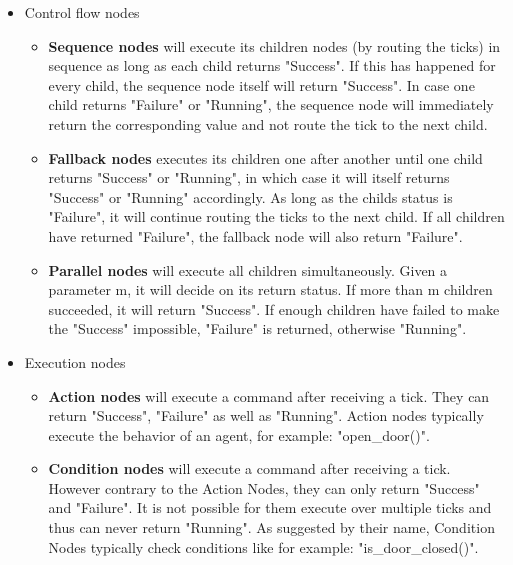 \begin{itemize}
	\item Control flow nodes
	\begin{itemize}
		\item \textbf{Sequence nodes} will execute its children nodes (by routing the ticks) in sequence as long as each child returns "Success". If this has happened for every child, the sequence node itself will return "Success". In case one child returns "Failure" or "Running", the sequence node will immediately return the corresponding value and not route the tick to the next child.
		
		\item \textbf{Fallback nodes} executes its children one after another until one child returns "Success" or "Running", in which case it will itself returns "Success" or "Running" accordingly. As long as the childs status is "Failure", it will continue routing the ticks to the next child. If all children have returned "Failure", the fallback node will also return "Failure".
		
		\item \textbf{Parallel nodes} will execute all children simultaneously. Given a parameter m, it will decide on its return status. If more than m children succeeded, it will return "Success". If enough children have failed to make the "Success" impossible, "Failure" is returned, otherwise "Running".
	\end{itemize}
	\item Execution nodes
	\begin{itemize}
		\item \textbf{Action nodes} will execute a command after receiving a tick. They can return "Success", "Failure" as well as "Running". Action nodes typically execute the behavior of an agent, for example: "open\_door()".
		
		\item \textbf{Condition nodes} will execute a command after receiving a tick. However contrary to the  Action Nodes, they can only return "Success" and "Failure". It is not possible for them execute over multiple ticks and thus can never return "Running". As suggested by their name, Condition Nodes typically check conditions like for example: "is\_door\_closed()".
	\end{itemize}
\end{itemize}
